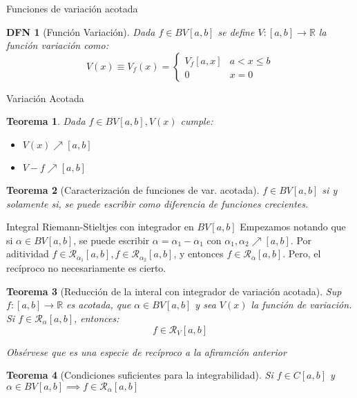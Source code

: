 \documentclass[a4paper]{article}\usepackage{/home/alonso/Documents/Projects/formularios/styles}
\newtheorem{definition}{DFN}
\theoremstyle{mytheoremstyle}
\newtheorem{theorem}{Teorema}
\newcommand{\R}{\mathbb{R}}
\newcommand{\1}{\mathds{1}}
\begin{document}
\begin{multicols*}{3}
\begin{roundbox}{Funciones de variación acotada}
	\begin{definition}[Función Variación]
		Dada $ f \in BV[a,b] $ se define $ V : [a,b] \to \R $ la función variación como:
		\[
			V(x) \equiv V_f(x) =
			\begin{cases}
				V_f [a,x] & a< x \leq b \\
				0 & x=0
			\end{cases}
		\]
	\end{definition}
\end{roundbox}

\pagebreak

\begin{roundbox}{Variación Acotada}
	\begin{theorem}
		Dada $ f \in BV[a,b], V(x) $ cumple:
		\begin{itemize}
			\item $ V(x) \nearrow [a,b] $
			\item $ V -f \nearrow [a,b]$
		\end{itemize}
	\end{theorem}

	\begin{theorem}[Caracterización de funciones de var. acotada]
		$ f \in BV[a,b]$ si y solamente si, se puede escribir como diferencia de funciones crecientes.
	\end{theorem}
\end{roundbox}

\begin{roundbox}{Integral Riemann-Stieltjes con integrador en $BV[a,b] $}
	Empezamos notando que si $ \alpha \in BV[a,b] $, se puede escribir $ \alpha = \alpha_1 - \alpha_1 $ con $ \alpha_1, \alpha_2 \nearrow [a,b] $.
	Por aditividad $ f \in \mathcal{R}_{\alpha_1} [a,b], f \in \mathcal{R}_{\alpha_2} [a,b]$, y entonces $ f \in \mathcal{R}_{\alpha} [a,b]$.
	Pero, el recíproco no necesariamente es cierto.

	\begin{theorem}[Reducción de la interal con integrador de variación acotada]
		Sup $  f : [a,b] \to \R $ es acotada, que $  \alpha \in BV[a,b] $ y sea $ V(x) $ la función de variación.
		Si $ f \in \mathcal{R}_{\alpha} [a,b] $, entonces:
		\[
			f \in \mathcal{R}_{V} [a,b]
		\]

		Obsérvese que es una especie de recíproco a la afiramción anterior
	\end{theorem}

	\begin{theorem}[Condiciones suficientes para la integrabilidad]
		Si $ f \in C[a,b] $ y $ \alpha \in BV[a,b] \implies f \in \mathcal{R}_{\alpha} [a,b] $
	\end{theorem}


\end{roundbox}
\end{multicols*}
\end{document}
